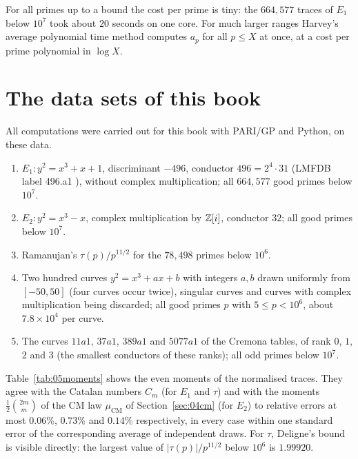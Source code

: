 For all primes up to a bound the cost per prime is tiny: the $664{,}577$ traces of $E_1$ below $10^7$ took about $20$ seconds on one core. For much larger ranges Harvey's average polynomial time method \cite{harvey2014} computes $a_p$ for all $p\le X$ at once, at a cost per prime polynomial in $\log X$.

\section{The data sets of this book}

All computations were carried out for this book with PARI/GP and Python, on these data.

\begin{enumerate}
\item $E_1: y^2 = x^3 + x + 1$, discriminant $-496$, conductor $496 = 2^4\cdot31$ (LMFDB label 496.a1 \cite{lmfdb}), without complex multiplication; all $664{,}577$ good primes below $10^7$.
\item $E_2: y^2 = x^3 - x$, complex multiplication by $\mathbb{Z}[i]$, conductor $32$; all good primes below $10^7$.
\item Ramanujan's $\tau(p)/p^{11/2}$ for the $78{,}498$ primes below $10^6$.
\item Two hundred curves $y^2 = x^3 + ax + b$ with integers $a,b$ drawn uniformly from $[-50,50]$ (four curves occur twice), singular curves and curves with complex multiplication being discarded; all good primes $p$ with $5\le p<10^6$, about $7.8\times10^4$ per curve.
\item The curves $11a1$, $37a1$, $389a1$ and $5077a1$ of the Cremona tables, of rank $0$, $1$, $2$ and $3$ (the smallest conductors of these ranks); all odd primes below $10^7$.
\end{enumerate}

Table~\ref{tab:05moments} shows the even moments of the normalised traces. They agree with the Catalan numbers $C_m$ (for $E_1$ and $\tau$) and with the moments $\frac12\binom{2m}{m}$ of the CM law $\mu_{\mathrm{CM}}$ of Section~\ref{sec:04cm} (for $E_2$) to relative errors at most $0.06\%$, $0.73\%$ and $0.14\%$ respectively, in every case within one standard error of the corresponding average of independent draws. For $\tau$, Deligne's bound is visible directly: the largest value of $|\tau(p)|/p^{11/2}$ below $10^6$ is $1.99920$.


